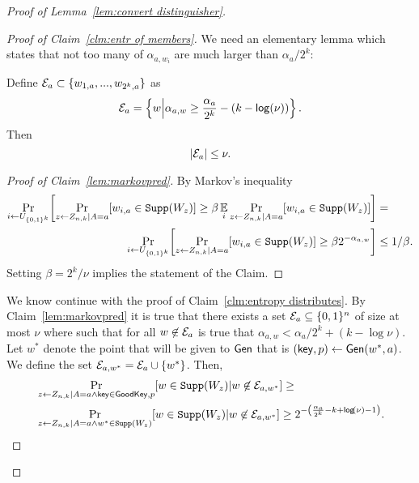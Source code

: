 \begin{proof}[Proof of Lemma~\ref{lem:convert distinguisher}]
\begin{proof}[Proof of Claim~\ref{clm:entr of members}]
\noindent
We need an elementary lemma which states that not too many of $\alpha_{a, w_i}$ are much larger than $\alpha_a/2^k$:
\begin{claim}
    \label{lem:markovpred} %
    Define $\mathcal{E}_a \subset \{w_{1,a},..., w_{2^k, a}\}$ as \[\mathcal{E}_a =\left\{w \middle| \alpha_{a,w} \ge \frac{\alpha_{a}}{2^k} -(k-\mathsf{log}\!\left(\nu\right))\right\}.\] %
    Then 
    \[
    \left|\mathcal{E}_a\right|\le \nu.
    \]
\end{claim}
\begin{proof}[Proof of Claim~\ref{lem:markovpred}]
By Markov's inequality
\begin{align*}
    \Pr\limits_{i\leftarrow U_{\{0, 1\}^k}}\!\left[\Pr_{z\leftarrow Z_{n,k} | A=a}[w_{i,a}\in \mathtt{Supp}(W_z)] \ge \beta \operatorname*{\mathbb{E}}_i  \Pr_{z\leftarrow Z_{n,k} | A=a}[w_{i,a}\in \mathtt{Supp}(W_z)]\right]&=\\
        \Pr\limits_{i\leftarrow U_{\{0, 1\}^k}}\!\left[\Pr_{z\leftarrow Z_{n,k} | A=a}[w_{i,a}\in \mathtt{Supp}(W_z)] \ge \beta 2^{-\alpha_{a,w}}\right]
    &\le 1/\beta.
    \end{align*}
    Setting $\beta = 2^k/\nu$ implies the statement of the Claim.
%
\end{proof}
\noindent
We know continue with the proof of Claim~\ref{clm:entropy distributes}. By Claim~\ref{lem:markovpred} it is true that there exists a set $\mathcal{E}_a\subseteq \{0, 1\}^n$ of size at most  $\nu$ where  such that for all $w\not \in \mathcal{E}_a$ is true that $\alpha_{a, w}< \alpha_a/2^k+(k-\log{\nu}).$
Let $w^*$ denote the point that will be given to ${\mathsf{Gen}}$ that is $(\mathsf{key}, p)\leftarrow {\ensuremath{\mathsf{Gen}}}(w^*, a)$.  We define the set $\mathcal{E}_{a,w^*} = \mathcal{E}_a \cup \{w^*\}$.
Then,
\begin{align*}
&\Pr_{z\leftarrow \znk| A=a \wedge \mathsf{key}\in \goodkey, p}[w\in \supp(W_z) | w\not \in \easy_{a,w^*}] \ge\\
&\Pr_{z\leftarrow \znk| A=a \wedge w^*\in \supp(W_z)}[w\in \supp(W_z) | w\not \in \easy_{a,w^*}]\ge 2^{-\left(\frac{\alpha_a}{2^k}-k+\log{\nu}-1\right)}.

\end{align*}
\end{proof}
\end{proof}
